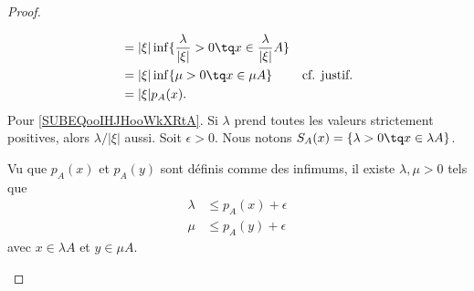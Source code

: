 \begin{proof}
\begin{subproof}
\begin{subequations}
\begin{align}
				           & =| \xi |\inf\{ \frac{ \lambda }{ | \xi | }>0\tq x\in\frac{ \lambda }{ | \xi | }A \}                                                 \\
				           & =| \xi |\inf\{ \mu>0\tq x\in \mu A \}                                               & \text{cf. justif.}		\label{SUBEQooIHJHooWkXRtA} \\
				           & =| \xi |p_A(x).
			\end{align}
		\end{subequations}
		Pour \eqref{SUBEQooIHJHooWkXRtA}. Si \( \lambda\) prend toutes les valeurs strictement positives, alors \( \lambda/| \xi |\) aussi.
		\spitem[\( p_A(x+y)\leq p_A(x)+p_A(y)\)]
		Soit \( \epsilon>0\). Nous notons \( S_A(x)=\{ \lambda>0 \tq x\in \lambda A \}\).

		Vu que \( p_A(x)\) et \( p_A(y)\) sont définis comme des infimums, il existe \( \lambda,\mu>0\) tels que
		\begin{subequations}
			\begin{align}
				\lambda & \leq p_A(x)+\epsilon \\
				\mu     & \leq p_A(y)+\epsilon
			\end{align}
		\end{subequations}
		avec \( x\in \lambda A\) et \( y\in \mu A\).


\end{subproof}
\end{proof}
